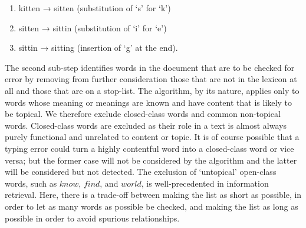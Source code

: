 \begin{enumerate}
    \item kitten → sitten (substitution of `s' for `k')
    \item sitten → sittin (substitution of `i' for `e')
    \item sittin → sitting (insertion of `g' at the end).
\end{enumerate}


The second sub-step identifies words in the document that are to be checked for
error by removing from further consideration those that are not in the lexicon
at all and those that are on a stop-list. The algorithm, by its nature, applies
only to words whose meaning or meanings are known and have content that is
likely to be topical. We therefore exclude closed-class words and common
non-topical words. Closed-class words are excluded as their role in a text is
almost always purely functional and unrelated to content or topic. It is of
course possible that a typing error could turn a highly contentful word into a
closed-class word or vice versa; but the former case will not be considered by
the algorithm and the latter will be considered but not detected. The exclusion
of `untopical' open-class words, such as \(know\), \(find\), and \(world\), is
well-precedented in information retrieval. Here, there is a trade-off between
making the list as short as possible, in order to let as many words as possible
be checked, and making the list as long as possible in order to avoid spurious
relationships.
